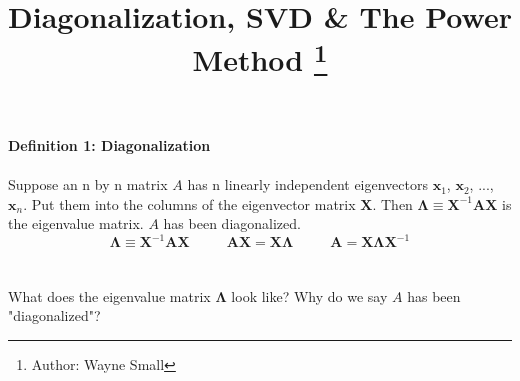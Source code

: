 \documentclass{tufte-handout}
\title{Diagonalization, SVD \& The Power Method \thanks{Author: Wayne Small}}
\begin{document}
\[\]
{\Large\textbf{Definition 1: Diagonalization}}\\\leavevmode\\
\noindent Suppose an n by n matrix $A$ has n linearly independent eigenvectors $\mathbf{x}_1$, $\mathbf{x}_2$, ..., $\mathbf{x}_n$. Put them into the columns of the eigenvector matrix $\mathbf{X}$. Then $\mathbf{\Lambda}\equiv\mathbf{X}^{-1}\mathbf{A}\mathbf{X}$ is the eigenvalue matrix. $A$ has been diagonalized.
\[
\mathbf{\Lambda}\equiv\mathbf{X}^{-1}\mathbf{A}\mathbf{X}
~~~~~~~~~~~~
\mathbf{A}\mathbf{X}= \mathbf{X}\mathbf{\Lambda}
~~~~~~~~~~~~
\mathbf{A}= \mathbf{X}\mathbf{\Lambda}\mathbf{X}^{-1}
\]\\\leavevmode\\
\noindent What does the eigenvalue matrix $\mathbf{\Lambda}$ look like? Why do we say $A$ has been "diagonalized"?\\\leavevmode
\end{document}
